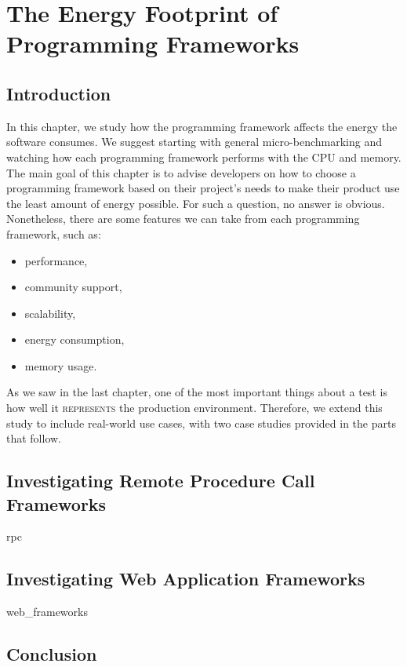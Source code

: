 \chapter{The Energy Footprint of Programming Frameworks}
\label{chapter:porgramming_langauges}
\section{Introduction}
In this chapter, we study how the programming framework affects the energy the software consumes.
We suggest starting with general micro-benchmarking and watching how each programming framework performs with the CPU and memory.
The main goal of this chapter is to advise developers on how to choose a programming framework based on their project's needs to make their product use the least amount of energy possible.
For such a question, no answer is obvious.
Nonetheless, there are some features we can take from each programming framework, such as:
\begin{itemize}
    \item performance,
    \item community support,
    \item scalability,
    \item energy consumption,
    \item memory usage.
\end{itemize}

As we saw in the last chapter, one of the most important things about a test is how well it \textsc{represents} the production environment.
Therefore, we extend this study to include real-world use cases, with two case studies provided in the parts that follow.

\section{Investigating Remote Procedure Call Frameworks}
{rpc}
\clearpage

\section{Investigating Web Application Frameworks}
{web_frameworks}

\section{Conclusion}
